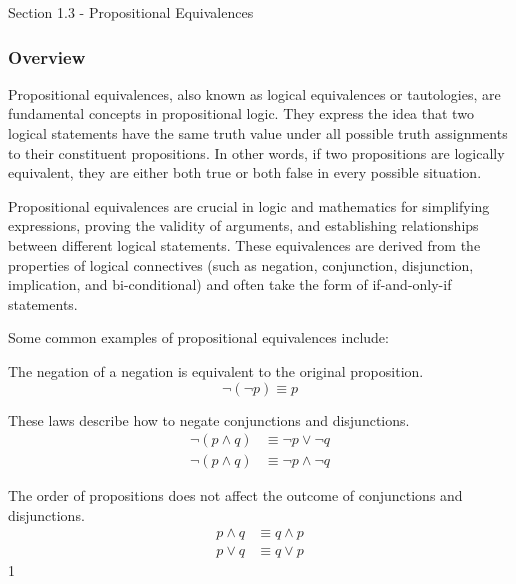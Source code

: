 \begin{notes}{Section 1.3 - Propositional Equivalences}
    \subsubsection*{Overview}

    Propositional equivalences, also known as logical equivalences or tautologies, are fundamental concepts in propositional logic. They express the idea that two logical statements have the same truth 
    value under all possible truth assignments to their constituent propositions. In other words, if two propositions are logically equivalent, they are either both true or both false in every possible 
    situation.

    Propositional equivalences are crucial in logic and mathematics for simplifying expressions, proving the validity of arguments, and establishing relationships between different logical statements. 
    These equivalences are derived from the properties of logical connectives (such as negation, conjunction, disjunction, implication, and bi-conditional) and often take the form of if-and-only-if statements.

    Some common examples of propositional equivalences include:

    \begin{highlight}
        The negation of a negation is equivalent to the original proposition.
        \begin{equation*}
            \neg(\neg p) \equiv p
        \end{equation*}
    \end{highlight}

    \begin{highlight}
        These laws describe how to negate conjunctions and disjunctions.
        \begin{align*}
            \neg (p \wedge q) & \equiv \neg p \vee \neg q \\
            \neg (p \wedge q) & \equiv \neg p \wedge \neg q
        \end{align*}
    \end{highlight}

    \begin{highlight}
        The order of propositions does not affect the outcome of conjunctions and disjunctions.
        \begin{align*}
            p \wedge q & \equiv q \wedge p \\
            p \vee q & \equiv q \vee p
        \end{align*}1
    \end{highlight}


\end{notes}
